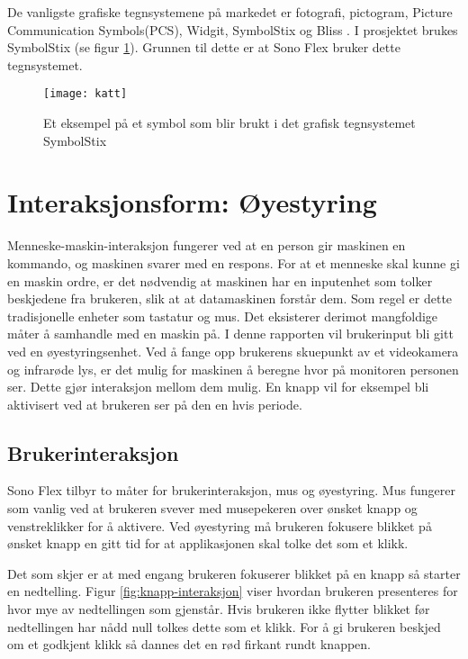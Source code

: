 De vanligste grafiske tegnsystemene på markedet er fotografi, pictogram, Picture Communication Symbols(PCS), Widgit, SymbolStix og Bliss \cite{GrafiskTegn}. I prosjektet brukes SymbolStix (se figur \ref{fig:katt}). Grunnen til dette er at Sono Flex bruker dette tegnsystemet.


\begin{figure}[ht!]
\centering
\texttt{[image: katt]}
\caption{Et eksempel på et symbol som blir brukt i det grafisk tegnsystemet SymbolStix}
\label{fig:katt}
\end{figure}

\section{Interaksjonsform: Øyestyring}

Menneske-maskin-interaksjon fungerer ved at en person gir maskinen en kommando, og maskinen svarer med en respons. For at et menneske skal kunne gi en maskin ordre, er det nødvendig at maskinen har en inputenhet som tolker beskjedene fra brukeren, slik at at datamaskinen forstår dem.  Som regel er dette tradisjonelle enheter som tastatur og mus. Det eksisterer derimot mangfoldige måter å samhandle med en maskin på. I denne rapporten vil brukerinput bli gitt ved en øyestyringsenhet.  Ved å fange opp brukerens skuepunkt av et videokamera og infrarøde lys, er det mulig for maskinen å beregne hvor på monitoren personen ser. Dette gjør interaksjon mellom dem mulig. En knapp vil for eksempel bli aktivisert ved at brukeren ser på den en hvis periode. 

\subsection{Brukerinteraksjon}

Sono Flex tilbyr to måter for brukerinteraksjon, mus og øyestyring. Mus fungerer som vanlig ved at brukeren svever med musepekeren over ønsket knapp og venstreklikker for å aktivere. Ved øyestyring må brukeren fokusere blikket på ønsket knapp en gitt tid for at applikasjonen skal tolke det som et klikk. 

Det som skjer er at med engang brukeren fokuserer blikket på en knapp så starter en nedtelling. Figur \ref{fig:knapp-interaksjon} viser hvordan brukeren presenteres for hvor mye av nedtellingen som gjenstår.  Hvis brukeren ikke flytter blikket før nedtellingen har nådd null tolkes dette som et klikk.
For å gi brukeren beskjed om et godkjent klikk så dannes det en rød firkant rundt knappen. 

